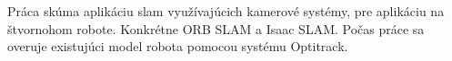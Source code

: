 Práca skúma aplikáciu \acrshort{slam} využívajúcich kamerové systémy, pre aplikáciu na štvornohom robote. Konkrétne ORB SLAM a Isaac SLAM. Počas práce sa overuje existujúci model robota pomocou systému Optitrack.